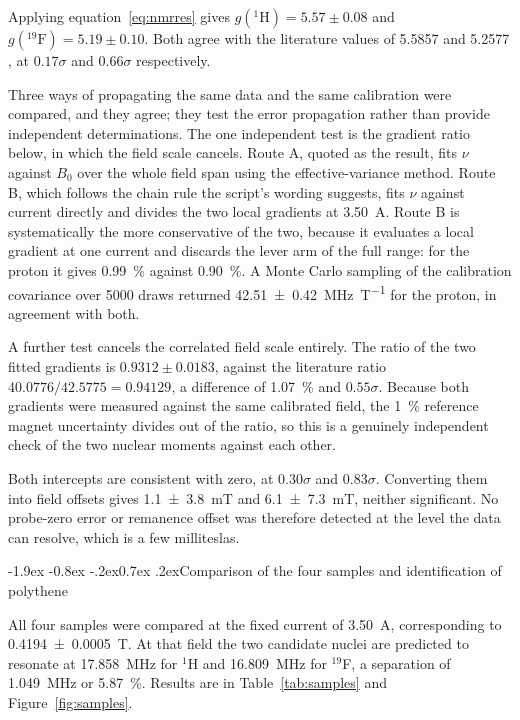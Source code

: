\documentclass[11pt,a4paper]{article}
\makeatletter
\renewcommand\subsection{\@startsection{subsection}{2}{\z@}%
  {-1.9ex \@plus -0.8ex \@minus -.2ex}{0.7ex \@plus .2ex}{\normalfont\normalsize\bfseries}}
\makeatother
\begin{document}
Applying equation~\eqref{eq:nmrres} gives $g(^{1}\mathrm{H}) = 5.57 \pm 0.08$ and
$g(^{19}\mathrm{F}) = 5.19 \pm 0.10$. Both agree with the literature values of 5.5857
\cite{codata} and 5.2577 \cite{stone,harris}, at $0.17\sigma$ and $0.66\sigma$ respectively.

Three ways of propagating the same data and the same calibration were compared, and they agree;
they test the error propagation rather than provide independent determinations. The one
independent test is the gradient ratio below, in which the field scale cancels. Route A, quoted as
the result, fits $\nu$ against $B_0$ over the whole field span using the effective-variance method.
Route B, which follows the chain rule the script's wording suggests, fits $\nu$ against current
directly and divides the two local gradients at \SI{3.50}{\ampere}. Route B is systematically the
more conservative of the two, because it evaluates a local gradient at one current and discards
the lever arm of the full range: for the proton it gives \SI{0.99}{\percent} against
\SI{0.90}{\percent}. A Monte Carlo sampling of the calibration covariance over 5000 draws returned
\SI{42.51 \pm 0.42}{\mega\hertz\per\tesla} for the proton, in agreement with both.

A further test cancels the correlated field scale entirely. The ratio of the two fitted gradients
is $0.9312 \pm 0.0183$, against the literature ratio $40.0776/42.5775 = 0.94129$, a difference of
\SI{1.07}{\percent} and $0.55\sigma$. Because both gradients were measured against the same
calibrated field, the \SI{1}{\percent} reference magnet uncertainty divides out of the ratio, so
this is a genuinely independent check of the two nuclear moments against each other.

Both intercepts are consistent with zero, at $0.30\sigma$ and $0.83\sigma$. Converting them into
field offsets gives \SI{+1.1 \pm 3.8}{\milli\tesla} and \SI{+6.1 \pm 7.3}{\milli\tesla},
neither significant. No probe-zero error or remanence offset was therefore detected at the level
the data can resolve, which is a few milliteslas.

\subsection{Comparison of the four samples and identification of polythene}
\label{sec:samples}

All four samples were compared at the fixed current of \SI{3.50}{\ampere}, corresponding to
\SI{0.4194 \pm 0.0005}{\tesla}. At that field the two candidate nuclei are predicted to resonate
at \SI{17.858}{\mega\hertz} for $^{1}$H and \SI{16.809}{\mega\hertz} for $^{19}$F, a separation of
\SI{1.049}{\mega\hertz} or \SI{5.87}{\percent}. Results are in Table~\ref{tab:samples} and
Figure~\ref{fig:samples}.
\end{document}

